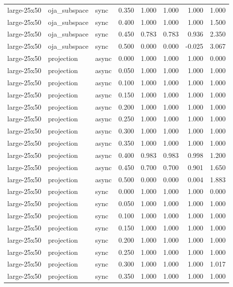\begin{tabular}{lllrrrrr}
large-25x50 & oja\_subspace & sync & 0.350 & 1.000 & 1.000 & 1.000 & 1.000 \\
large-25x50 & oja\_subspace & sync & 0.400 & 1.000 & 1.000 & 1.000 & 1.500 \\
large-25x50 & oja\_subspace & sync & 0.450 & 0.783 & 0.783 & 0.936 & 2.350 \\
large-25x50 & oja\_subspace & sync & 0.500 & 0.000 & 0.000 & -0.025 & 3.067 \\
large-25x50 & projection & async & 0.000 & 1.000 & 1.000 & 1.000 & 0.000 \\
large-25x50 & projection & async & 0.050 & 1.000 & 1.000 & 1.000 & 1.000 \\
large-25x50 & projection & async & 0.100 & 1.000 & 1.000 & 1.000 & 1.000 \\
large-25x50 & projection & async & 0.150 & 1.000 & 1.000 & 1.000 & 1.000 \\
large-25x50 & projection & async & 0.200 & 1.000 & 1.000 & 1.000 & 1.000 \\
large-25x50 & projection & async & 0.250 & 1.000 & 1.000 & 1.000 & 1.000 \\
large-25x50 & projection & async & 0.300 & 1.000 & 1.000 & 1.000 & 1.000 \\
large-25x50 & projection & async & 0.350 & 1.000 & 1.000 & 1.000 & 1.000 \\
large-25x50 & projection & async & 0.400 & 0.983 & 0.983 & 0.998 & 1.200 \\
large-25x50 & projection & async & 0.450 & 0.700 & 0.700 & 0.901 & 1.650 \\
large-25x50 & projection & async & 0.500 & 0.000 & 0.000 & 0.004 & 1.883 \\
large-25x50 & projection & sync & 0.000 & 1.000 & 1.000 & 1.000 & 0.000 \\
large-25x50 & projection & sync & 0.050 & 1.000 & 1.000 & 1.000 & 1.000 \\
large-25x50 & projection & sync & 0.100 & 1.000 & 1.000 & 1.000 & 1.000 \\
large-25x50 & projection & sync & 0.150 & 1.000 & 1.000 & 1.000 & 1.000 \\
large-25x50 & projection & sync & 0.200 & 1.000 & 1.000 & 1.000 & 1.000 \\
large-25x50 & projection & sync & 0.250 & 1.000 & 1.000 & 1.000 & 1.000 \\
large-25x50 & projection & sync & 0.300 & 1.000 & 1.000 & 1.000 & 1.017 \\
large-25x50 & projection & sync & 0.350 & 1.000 & 1.000 & 1.000 & 1.000 \\

\end{tabular}
